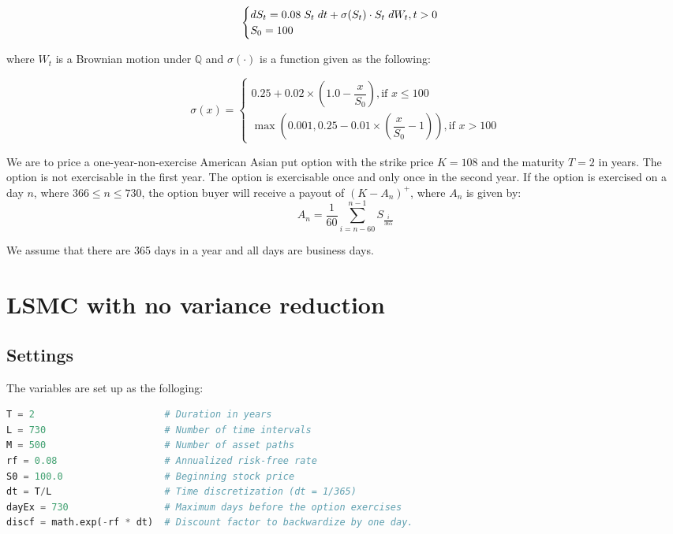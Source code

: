 \documentclass[12pt]{article}
\begin{document}
$$
\begin{cases}
dS_t = 0.08\hspace{1mm}S_t\hspace{1mm}dt + \sigma(S_t) \cdot S_t\hspace{1mm}dW_t, t > 0 \\
S_0 = 100
\end{cases}
$$

where $W_t$ is a Brownian motion under $\mathbb{Q}$ and $\sigma(\cdot)$ is a function given as the following:

$$
\sigma(x) = 
\begin{cases}
0.25+ 0.02 \times \left ( 1.0 - \dfrac{x}{S_0} \right), \text{if }x\leq 100 \\
\max\left(0.001, 0.25-0.01 \times\left(\dfrac{x}{S_0} - 1\right) \right), \text{if }x>100
\end{cases}
$$

We are to price a one-year-non-exercise American Asian put option with the strike price $K=108$ and the maturity $T=2$ in years. The option is not exercisable in the first year. The option is exercisable once and only once in the second year. If the option is exercised on a day $n$, where $366 \leq n \leq 730$, the option buyer will receive a payout of $(K-A_n)^+$, where $A_n$ is given by:
$$A_n = \dfrac{1}{60} \sum_{i=n-60}^{n-1} S_{\frac{i}{365}}$$

We assume that there are 365 days in a year and all days are business days.

\newpage
\section{LSMC with no variance reduction}

\subsection{Settings}

The variables are set up as the folloging:

\begin{lstlisting}[language=Python]
T = 2                       # Duration in years
L = 730                     # Number of time intervals
M = 500                     # Number of asset paths
rf = 0.08                   # Annualized risk-free rate
S0 = 100.0                  # Beginning stock price
dt = T/L                    # Time discretization (dt = 1/365)
dayEx = 730                 # Maximum days before the option exercises
discf = math.exp(-rf * dt)  # Discount factor to backwardize by one day.
\end{lstlisting}
\end{document}
